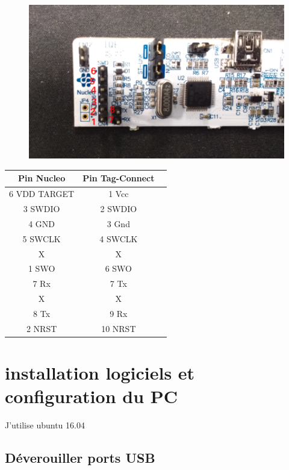 \documentclass{article}
\begin{document}
\begin{figure}[H]
\begin{center}
\advance\leftskip-3cm
\advance\rightskip-3cm
\includegraphics[keepaspectratio=true,scale=0.5]{Nucleo_pins.png}
\label{visina8}
\end{center}\end{figure}

\begin{center}
 \begin{tabular}{||c | c | c ||} 
 \hline
 Pin Nucleo  & Pin Tag-Connect \\ [0.8ex] 
 \hline\hline
  6 VDD TARGET   &  1 Vcc \\ 
 \hline
   3 SWDIO & 2 SWDIO \\
 \hline
  4 GND  & 3 Gnd\\
 \hline
  5 SWCLK  &  4 SWCLK\\
 \hline
  X  & X \\ [1ex] 
 \hline
  1 SWO  & 6 SWO \\ [1ex]
 \hline
  7 Rx  & 7 Tx \\ [1ex] 
 \hline
  X  & X \\ [1ex] 
 \hline
 8 Tx & 9 Rx \\ [1ex] 
 \hline
 2 NRST & 10 NRST\\ [1ex] 
 \hline
\end{tabular}
\end{center}



\section{installation logiciels et configuration du PC}
J'utilise ubuntu 16.04
\subsection{Déverouiller ports USB}
\end{document}
